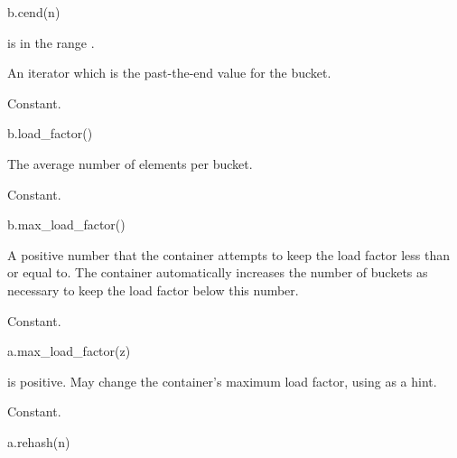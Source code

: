 %
\begin{itemdecl}
b.cend(n)
\end{itemdecl}

\begin{itemdescr}
\pnum
\result
{}

\pnum
\expects
{} is in the range \tcode{[0, b.bucket_count())}.

\pnum
\returns
An iterator which is the past-the-end value for the bucket.

\pnum
\complexity
Constant.
\end{itemdescr}

%
\begin{itemdecl}
b.load_factor()
\end{itemdecl}

\begin{itemdescr}
\pnum
\result
{}

\pnum
\returns
The average number of elements per bucket.

\pnum
\complexity
Constant.
\end{itemdescr}

%
\begin{itemdecl}
b.max_load_factor()
\end{itemdecl}

\begin{itemdescr}
\pnum
\result
{}

\pnum
\returns
A positive number
that the container attempts to keep the load factor less than or equal to.
The container automatically increases the number of buckets as necessary
to keep the load factor below this number.

\pnum
\complexity
Constant.
\end{itemdescr}

%
\begin{itemdecl}
a.max_load_factor(z)
\end{itemdecl}

\begin{itemdescr}
\pnum
\result
{}

\pnum
\expects
{} is positive.
May change the container's maximum load factor, using  as a hint.

\pnum
\complexity
Constant.
\end{itemdescr}

%
\begin{itemdecl}
a.rehash(n)
\end{itemdecl}

